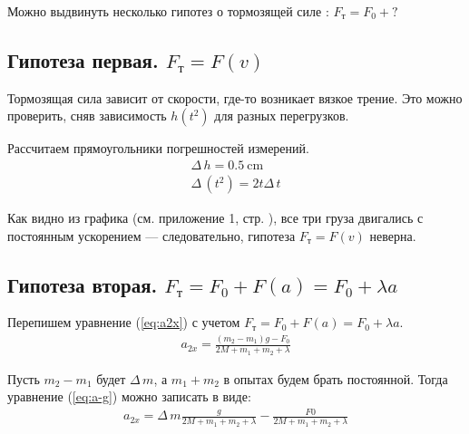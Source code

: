 \documentclass[a4paper,12pt]{report}
\begin{document}

Можно выдвинуть несколько гипотез о тормозящей силе : $F_\text{т}=F_0+?$

\subsection{Гипотеза первая. $F_\text{т}=F(v)$}
Тормозящая сила зависит от скорости, где-то возникает вязкое трение. Это можно проверить, сняв зависимость $h(t^2)$ для разных перегрузков. 

Рассчитаем прямоугольники погрешностей измерений.
\begin{gather*}
	\Delta\,h=0.5\ \text{cm}\\
	\Delta\,(t^2)=2t\Delta\,t
\end{gather*}


Как видно из графика (см. приложение 1, стр. \pageref{fig:htt}), все три груза двигались с постоянным ускорением --- следовательно, гипотеза $F_\text{т}=F(v)$ неверна. 


\subsection{Гипотеза вторая. $F_\text{т}=F_0+F(a)=F_0+\lambda{}a$}

Перепишем уравнение (\ref{eq:a2x}) с учетом $F_\text{т}=F_0+F(a)=F_0+\lambda{}a$. 
\begin{gather}
	\label{eq:a-g}
	a_{2x}=\frac{(m_2-m_1)g-F_0}{2M+m_1+m_2+\lambda}
\end{gather}

Пусть $m_2-m_1$ будет $\Delta\,m$, а $m_1+m_2$  в опытах будем брать постоянной. Тогда уравнение (\ref{eq:a-g}) можно записать в виде:
\begin{gather}
	\label{eq:a-dm}
	a_{2x}=\Delta\,m{}\frac{g}{2M+m_1+m_2+\lambda}-\frac{F0}{2M+m_1+m_2+\lambda}
\end{gather}
\end{document}
